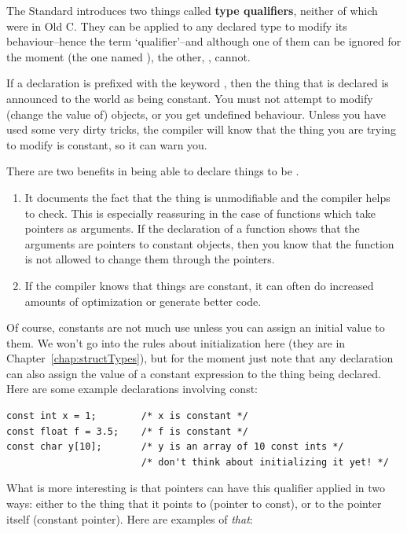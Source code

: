    The Standard introduces two things called \textbf{type qualifiers},
    neither of which were in Old C. They can be applied to any declared type
    to modify its behaviour--hence the term `qualifier'--and
    although one of them can be ignored for the moment (the one named
    \volatile{}), the other, \const, cannot.


   If a declaration is prefixed with the keyword \const, then
    the thing that is declared is announced to the world as being constant.
    You must not attempt to modify (change the value of) \const{}
    objects, or you get undefined behaviour. Unless you have used some very
    dirty tricks, the compiler will know that the thing you are trying to
    modify is constant, so it can warn you.


   There are two benefits in being able to declare things to be
    \const.


   \begin{enumerate}
    \item It documents the fact that the thing is unmodifiable and the
     compiler helps to check. This is especially reassuring in the case
     of functions which take pointers as arguments. If the declaration
     of a function shows that the arguments are pointers to constant
     objects, then you know that the function is not allowed to change
     them through the pointers.

    \item If the compiler knows that things are constant, it can often do
     increased amounts of optimization or generate better code.
   \end{enumerate}

   Of course, constants are not much use unless you can assign an initial
    value to them. We won't go into the rules about initialization here
    (they are in Chapter~\ref{chap:structTypes}),
    but for the moment just note that
    any declaration can also assign the value of a constant expression to
    the thing being declared. Here are some example declarations involving
    const:


   \begin{Verbatim}
const int x = 1;        /* x is constant */
const float f = 3.5;    /* f is constant */
const char y[10];       /* y is an array of 10 const ints */
                        /* don't think about initializing it yet! */
\end{Verbatim}

   What is more interesting is that pointers can have this qualifier
    applied in two ways: either to the thing that it points to (pointer to
    const), or to the pointer itself (constant pointer). Here are examples
    of \textit{that}:


